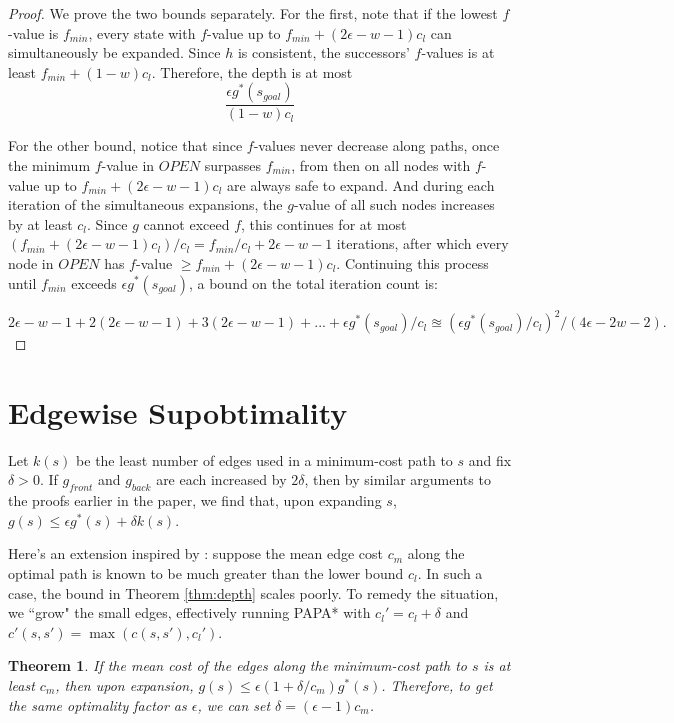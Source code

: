 \documentclass[letterpaper]{article}
\newtheorem{thm}{Theorem}
\begin{document}
\begin{proof}
We prove the two bounds separately. For the first, note that if the lowest $f$-value is $f_{min}$, every state with $f$-value up to $f_{min} + (2\epsilon-w-1)c_l$ can simultaneously be expanded. Since $h$ is consistent, the successors' $f$-values is at least $f_{min} + (1-w)c_l$. Therefore, the depth is at most
\[\frac{\epsilon g^*(s_{goal})}{(1-w)c_l}\]

For the other bound, notice that since $f$-values never decrease along paths, once the minimum $f$-value in $OPEN$ surpasses $f_{min}$, from then on all nodes with $f$-value up to $f_{min} + (2\epsilon-w-1)c_l$ are always safe to expand. And during each iteration of the simultaneous expansions, the $g$-value of all such nodes increases by at least $c_l$. Since $g$ cannot exceed $f$, this continues for at most $(f_{min} + (2\epsilon-w-1)c_l) / c_l = f_{min}/c_l + 2\epsilon-w-1$ iterations, after which every node in $OPEN$ has $f$-value $\ge f_{min} + (2\epsilon-w-1)c_l$. Continuing this process until $f_{min}$ exceeds $\epsilon g^*(s_{goal})$, a bound on the total iteration count is:

$2\epsilon-w-1 + 2(2\epsilon-w-1) + 3(2\epsilon-w-1) + ... + \epsilon g^*(s_{goal})/c_l
\approxeq (\epsilon g^*(s_{goal})/c_l )^2 / ( 4\epsilon-2w-2 ).$
\end{proof}

\section{Edgewise Supobtimality}

Let $k(s)$ be the least number of edges used in a minimum-cost path to $s$ and fix $\delta > 0$. If $g_{front}$ and $g_{back}$ are each increased by $2\delta$, then by similar arguments to the proofs earlier in the paper, we find that, upon expanding $s$, $g(s) \le \epsilon g^*(s) + \delta k(s)$.

Here's an extension inspired by \cite{klein1997randomized}: suppose the mean edge cost $c_m$ along the optimal path is known to be much greater than the lower bound $c_l$. In such a case, the bound in Theorem \ref{thm:depth} scales poorly. To remedy the situation, we ``grow" the small edges, effectively running PAPA* with $c_l' = c_l + \delta$ and $c'(s,s') = \max(c(s,s'), c_l')$.

\begin{thm}
\label{thm:delta}
If the mean cost of the edges along the minimum-cost path to $s$ is at least $c_m$, then upon expansion, $g(s) \le \epsilon(1+\delta/c_m)g^*(s)$. Therefore, to get the same optimality factor as $\epsilon$, we can set $\delta = (\epsilon-1)c_m$.
\end{thm}
\end{document}
